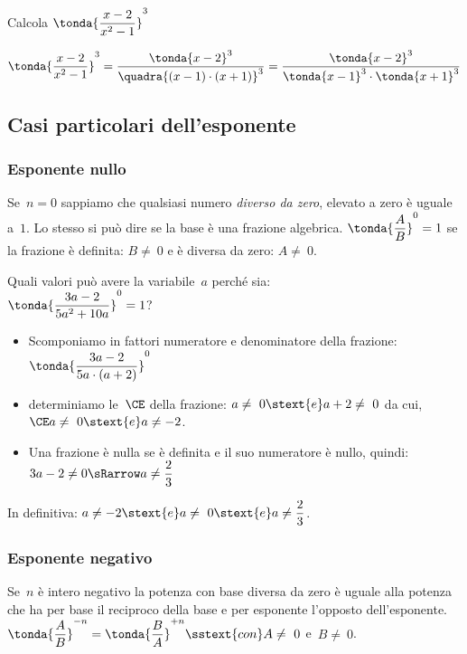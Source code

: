 \begin{esempio}{}{}
Calcola  \( \tonda{\dfrac{x-2}{x^{2}-1}} ^{3}\)

\vspace{-.5em}
\[\tonda{\dfrac{x-2}{x^{2}-1}} ^{3} =
\dfrac{\tonda{x-2}^3}{\quadra{(x-1)\cdot(x+1)}^3} = 
\dfrac{\tonda{x-2}^3}{\tonda{x-1}^3 \cdot \tonda{x+1}^3}\]
\end{esempio}

\subsection{Casi particolari dell'esponente}

\subsubsection{Esponente nullo}
Se~\(n = 0\) sappiamo che qualsiasi numero \emph{diverso da zero}, 
elevato a zero è uguale a~\(1\). 
Lo stesso si può dire se la base è una frazione algebrica.
\(\tonda{\dfrac{A}{B}}^0=1\) se la frazione è definita: 
\(B\neq~0\) e è diversa da zero: \(A\neq~0\).

\begin{esempio}{}{}
Quali valori può avere la variabile~\(a\) perché sia: \\
\(\tonda{\dfrac{3a-2}{5a^{2}+10a}} ^{0}=1\)?

\vspace{.5em}
\begin{itemize}[nosep]
\item Scomponiamo in fattori numeratore e denominatore della 
frazione:\\ \( \tonda{\dfrac{3a-2}{5a\cdot (a+2)}} ^{0}\)
\item determiniamo le~\(\CE\) della frazione:
\(a\neq~0 \stext{e} a+2\neq~0\) 
da cui, \(\CE a\neq~0 \stext{e} a\neq -2\).
\item Una frazione è nulla se è definita e il suo numeratore è nullo, 
quindi:
\(3a-2 \neq 0 \sRarrow a\neq \dfrac{2}{3}\)
\end{itemize}
In definitiva: 
\(a\neq -2 \stext{e} a\neq~0 \stext{e} a\neq \dfrac{2}{3}\).
\end{esempio}

\subsubsection{Esponente negativo}
Se~\(n\) è intero negativo la potenza con base diversa da zero è uguale 
alla potenza che ha per base il reciproco della base e per esponente 
l'opposto dell'esponente. 
\( \tonda{\dfrac{A}{B}} ^{-n}=
\tonda{\dfrac{B}{A}} ^{+n} \sstext{con} A\neq~0\) e~\(B\neq~0\).

